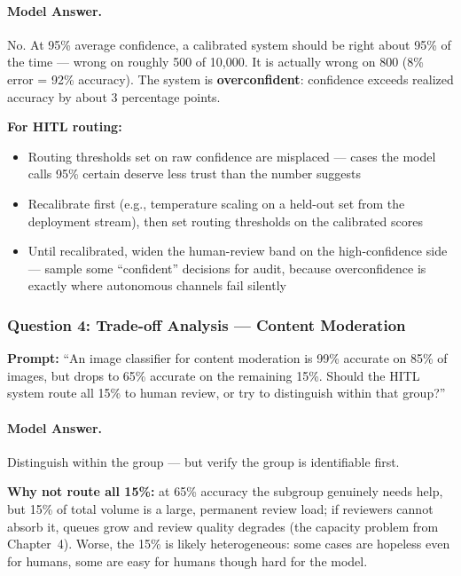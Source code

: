 \paragraph{Model Answer.}

No. At 95\% average confidence, a calibrated system should be right about 95\% of the time --- wrong on roughly 500 of 10,000. It is actually wrong on 800 (8\% error = 92\% accuracy). The system is \textbf{overconfident}: confidence exceeds realized accuracy by about 3 percentage points.

\textbf{For HITL routing:}
\begin{itemize}
    \item Routing thresholds set on raw confidence are misplaced --- cases the model calls 95\% certain deserve less trust than the number suggests
    \item Recalibrate first (e.g., temperature scaling on a held-out set from the deployment stream), then set routing thresholds on the calibrated scores
    \item Until recalibrated, widen the human-review band on the high-confidence side --- sample some ``confident'' decisions for audit, because overconfidence is exactly where autonomous channels fail silently
\end{itemize}

\subsubsection{Question 4: Trade-off Analysis --- Content Moderation}

\textbf{Prompt:} ``An image classifier for content moderation is 99\% accurate on 85\% of images, but drops to 65\% accurate on the remaining 15\%. Should the HITL system route all 15\% to human review, or try to distinguish within that group?''

\paragraph{Model Answer.}

Distinguish within the group --- but verify the group is identifiable first.

\textbf{Why not route all 15\%:} at 65\% accuracy the subgroup genuinely needs help, but 15\% of total volume is a large, permanent review load; if reviewers cannot absorb it, queues grow and review quality degrades (the capacity problem from Chapter~4). Worse, the 15\% is likely heterogeneous: some cases are hopeless even for humans, some are easy for humans though hard for the model.

